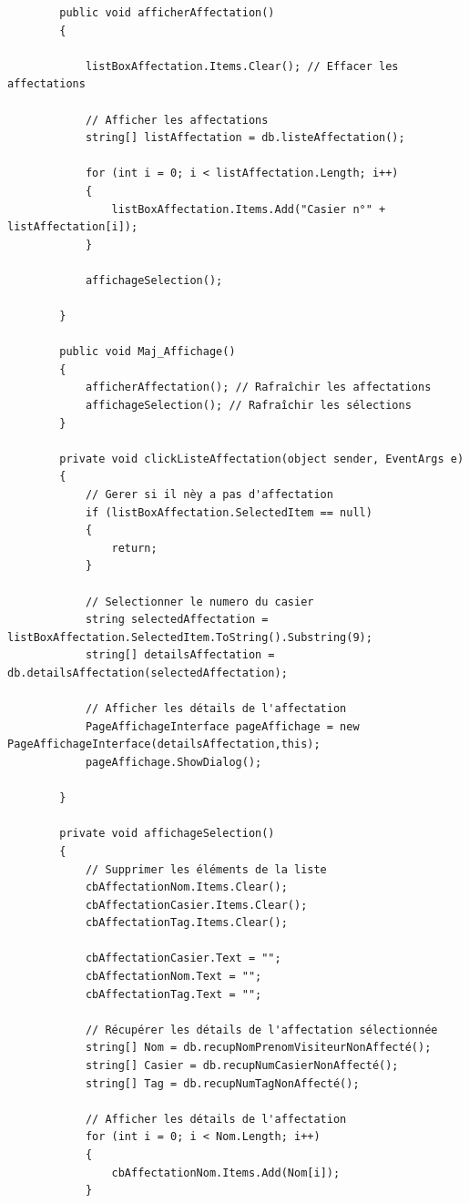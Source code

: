\documentclass[main.tex]{subfiles}
\begin{document}
\begin{lstlisting}
        public void afficherAffectation()
        {

            listBoxAffectation.Items.Clear(); // Effacer les affectations

            // Afficher les affectations
            string[] listAffectation = db.listeAffectation();

            for (int i = 0; i < listAffectation.Length; i++)
            {
                listBoxAffectation.Items.Add("Casier n°" + listAffectation[i]);
            }

            affichageSelection();

        }

        public void Maj_Affichage()
        {
            afficherAffectation(); // Rafraîchir les affectations
            affichageSelection(); // Rafraîchir les sélections
        }

        private void clickListeAffectation(object sender, EventArgs e)
        {
            // Gerer si il nèy a pas d'affectation
            if (listBoxAffectation.SelectedItem == null)
            {
                return;
            }

            // Selectionner le numero du casier
            string selectedAffectation = listBoxAffectation.SelectedItem.ToString().Substring(9);
            string[] detailsAffectation = db.detailsAffectation(selectedAffectation);

            // Afficher les détails de l'affectation
            PageAffichageInterface pageAffichage = new PageAffichageInterface(detailsAffectation,this);
            pageAffichage.ShowDialog();

        }

        private void affichageSelection()
        {
            // Supprimer les éléments de la liste
            cbAffectationNom.Items.Clear();
            cbAffectationCasier.Items.Clear();
            cbAffectationTag.Items.Clear();

            cbAffectationCasier.Text = "";
            cbAffectationNom.Text = "";
            cbAffectationTag.Text = "";

            // Récupérer les détails de l'affectation sélectionnée
            string[] Nom = db.recupNomPrenomVisiteurNonAffecté();
            string[] Casier = db.recupNumCasierNonAffecté();
            string[] Tag = db.recupNumTagNonAffecté();

            // Afficher les détails de l'affectation
            for (int i = 0; i < Nom.Length; i++)
            {
                cbAffectationNom.Items.Add(Nom[i]);
            }


\end{lstlisting}
\end{document}
